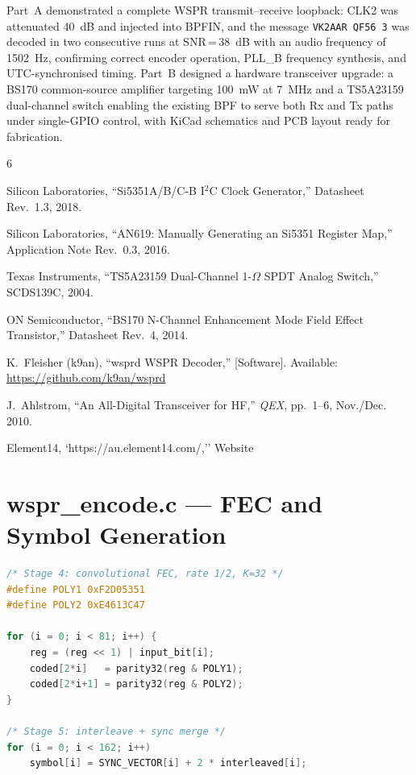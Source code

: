 \documentclass[conference]{IEEEtran}
\begin{document}
Part~A demonstrated a complete WSPR transmit--receive loopback: CLK2 was attenuated
40~dB and injected into BPFIN, and the message \texttt{VK2AAR QF56 3} was decoded
in two consecutive runs at SNR\,=\,38~dB with an audio frequency of 1502~Hz,
confirming correct encoder operation, PLL\_B frequency synthesis, and
UTC-synchronised timing. Part~B designed a hardware transceiver upgrade: a BS170
common-source amplifier targeting 100~mW at 7~MHz and a TS5A23159 dual-channel
switch enabling the existing BPF to serve both Rx and Tx paths under single-GPIO
control, with KiCad schematics and PCB layout ready for fabrication.

\begin{thebibliography}{6}

Silicon Laboratories, ``Si5351A/B/C-B I$^2$C Clock Generator,'' Datasheet
Rev.~1.3, 2018.

Silicon Laboratories, ``AN619: Manually Generating an Si5351 Register Map,''
Application Note Rev.~0.3, 2016.

Texas Instruments, ``TS5A23159 Dual-Channel 1-$\Omega$ SPDT Analog Switch,''
SCDS139C, 2004.

ON Semiconductor, ``BS170 N-Channel Enhancement Mode Field Effect Transistor,''
Datasheet Rev.~4, 2014.

K.~Fleisher (k9an), ``wsprd WSPR Decoder,'' [Software].
Available: \url{https://github.com/k9an/wsprd}

J.~Ahlstrom, ``An All-Digital Transceiver for HF,'' \textit{QEX},
pp.~1--6, Nov./Dec. 2010.

Element14, `https://au.element14.com/,'' Website

\end{thebibliography}

\appendix

\section{wspr\_encode.c --- FEC and Symbol Generation}
\label{app:encode}

\begin{lstlisting}[style=cstyle,language=C]
/* Stage 4: convolutional FEC, rate 1/2, K=32 */
#define POLY1 0xF2D05351
#define POLY2 0xE4613C47

for (i = 0; i < 81; i++) {
    reg = (reg << 1) | input_bit[i];
    coded[2*i]   = parity32(reg & POLY1);
    coded[2*i+1] = parity32(reg & POLY2);
}

/* Stage 5: interleave + sync merge */
for (i = 0; i < 162; i++)
    symbol[i] = SYNC_VECTOR[i] + 2 * interleaved[i];
\end{lstlisting}
\end{document}
